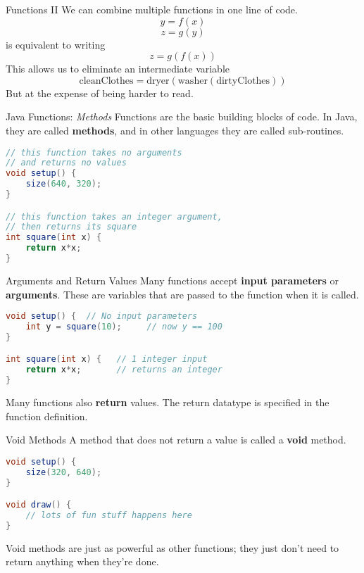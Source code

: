 \documentclass[pdf]{beamer}
\begin{document}
\begin{frame}{Functions II}
We can combine multiple functions in one line of code.
$$  y = f(x) $$
$$  z = g(y) $$
is equivalent to writing
$$  z = g(f(x))    $$
This allows us to eliminate an intermediate variable
$$ \text{cleanClothes} = \text{dryer}(\text{washer}(\text{dirtyClothes}))$$
But at the expense of being harder to read.
\end{frame}

\begin{frame}[fragile]{Java Functions: \textit{Methods}}
Functions are the basic building blocks of code. In Java, they are called \textbf{methods}, and in other languages they are called sub-routines.
\begin{lstlisting}[language=Java]
// this function takes no arguments 
// and returns no values
void setup() {
    size(640, 320);
}

// this function takes an integer argument,
// then returns its square
int square(int x) { 
    return x*x;     
}
\end{lstlisting}
\end{frame}

\begin{frame}[fragile]{Arguments and Return Values}
Many functions accept \textbf{input parameters} or \textbf{arguments}. These are variables that are passed to the function when it is called.
\begin{lstlisting}[language=Java]
void setup() {  // No input parameters
    int y = square(10);     // now y == 100
}

int square(int x) {   // 1 integer input
    return x*x;       // returns an integer
}
\end{lstlisting}
Many functions also \textbf{return} values. The return datatype is specified in the function definition.
\end{frame}


\begin{frame}[fragile]{Void Methods}
A method that does not return a value is called a \textbf{void} method.
\begin{lstlisting}[language=Java]
void setup() {
    size(320, 640);
}

void draw() {
    // lots of fun stuff happens here
}
\end{lstlisting}
Void methods are just as powerful as other functions; they just don't need to return anything when they're done.
\end{frame}
\end{document}
